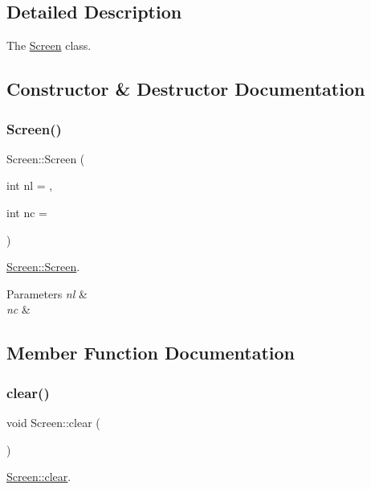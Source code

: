 \subsection{Detailed Description}
The \hyperlink{classScreen}{Screen} class. 

\subsection{Constructor \& Destructor Documentation}
\mbox{\label{classScreen_a071af83b6b9e1bf4a22e912ff0f6de0f}} 
\subsubsection{\texorpdfstring{Screen()}{Screen()}}
{\footnotesize\ttfamily Screen\+::\+Screen (\begin{DoxyParamCaption}\item[{int}]{nl = {},  }\item[{int}]{nc = {} }\end{DoxyParamCaption})}



\hyperlink{classScreen_a071af83b6b9e1bf4a22e912ff0f6de0f}{Screen\+::\+Screen}. 


\begin{DoxyParams}{Parameters}
{\em nl} & \\
\hline
{\em nc} & \\
\hline
\end{DoxyParams}


\subsection{Member Function Documentation}
\mbox{\label{classScreen_a35e74266b2a04e37b354ceff7a5f1031}} 
\subsubsection{\texorpdfstring{clear()}{clear()}}
{\footnotesize\ttfamily void Screen\+::clear (\begin{DoxyParamCaption}{ }\end{DoxyParamCaption})}



\hyperlink{classScreen_a35e74266b2a04e37b354ceff7a5f1031}{Screen\+::clear}. 

